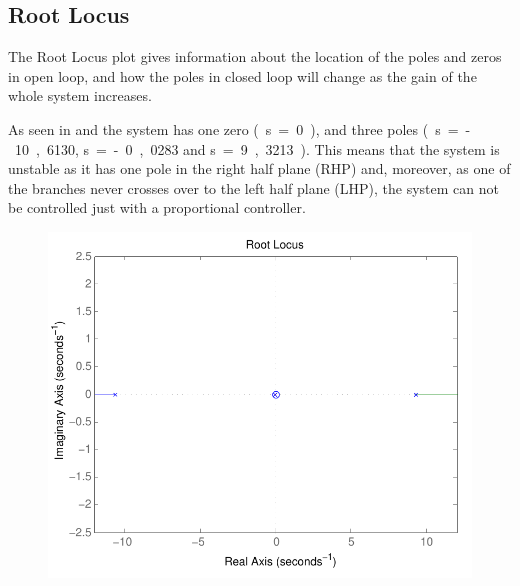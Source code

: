 \subsection{Root Locus}
The Root Locus plot gives information about the location of the poles and zeros in open loop, and how the poles in closed loop will change as the gain of the whole system increases.

As seen in  and  the system has one zero \si{(s=0)}, and three poles \si{(s=-10,6130}, \si{s=-0,0283} and \si{s=9,3213)}. This means that the system is unstable as it has one pole in the right half plane (RHP) and, moreover, as one of the branches never crosses over to the left half plane (LHP), the system can not be controlled just with a proportional controller.

\begin{minipage}{\linewidth}
 	\begin{minipage}{0.45\linewidth}
 		\begin{figure}[H]
 			\includegraphics[scale=.56]{figures/rlocusCubli}
 			\centering
 			\vspace{-.4cm}
 			\captionsetup{justification=centering}
 			\label{rlocusCubli}
 		\end{figure}\vspace{-5mm}
 	\end{minipage}
 	\hspace{0.03\linewidth}
 	\begin{minipage}{0.45\linewidth}

\end{minipage}
\end{minipage}
